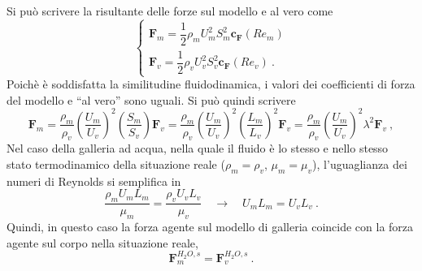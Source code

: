 \newline
Si può scrivere la risultante delle forze sul modello e al vero come
\begin{equation}
 \begin{cases}
  \bm{F}_m = \dfrac{1}{2}\rho_m U_m^2 S_m^2 \bm{c_F}(Re_m) \\
  \bm{F}_v = \dfrac{1}{2}\rho_v U_v^2 S_v^2 \bm{c_F}(Re_v) \ .
 \end{cases}
\end{equation}
Poichè è soddisfatta la similitudine fluidodinamica, i valori dei coefficienti di forza del modello e ``al vero'' sono uguali. Si può quindi scrivere
\begin{equation}
 \bm{F}_m = \dfrac{\rho_m}{\rho_v} \left( \dfrac{U_m}{U_v} \right)^2
  \left( \dfrac{S_m}{S_v} \right) \bm{F}_v = 
 \dfrac{\rho_m}{\rho_v} \left( \dfrac{U_m}{U_v} \right)^2
  \left( \dfrac{L_m}{L_v} \right)^2 \bm{F}_v = 
 \dfrac{\rho_m}{\rho_v} \left( \dfrac{U_m}{U_v} \right)^2
  \lambda^2 \bm{F}_v \ ,
\end{equation}
Nel caso della galleria ad acqua, nella quale il fluido è lo stesso e nello stesso stato termodinamico della situazione reale ($\rho_m = \rho_v$, $\mu_m = \mu_v$), l'uguaglianza dei numeri di Reynolds si semplifica in
\begin{equation}
 \dfrac{\rho_m U_m L_m}{\mu_m} = \dfrac{\rho_v U_v L_v}{\mu_v} \quad \rightarrow \quad
  U_m L_m = U_v L_v \ .
\end{equation}
Quindi, in questo caso la forza agente sul modello di galleria coincide con la forza agente sul corpo nella situazione reale,
\begin{equation}
 \bm{F}^{H_2O,s}_m = \bm{F}^{H_2O,s}_v \ .
\end{equation}

